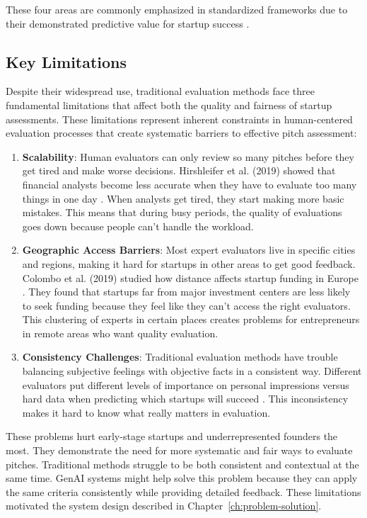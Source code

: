 These four areas are commonly emphasized in standardized frameworks due to their demonstrated predictive value for startup success \cite{Kalvapalle2024}.

\subsection{Key Limitations}\label{subsec:key-limitations}
Despite their widespread use, traditional evaluation methods face three fundamental limitations that affect both the quality and fairness of startup assessments. These limitations represent inherent constraints in human-centered evaluation processes that create systematic barriers to effective pitch assessment:

\begin{enumerate}
    \item \textbf{Scalability}: Human evaluators can only review so many pitches before they get tired and make worse decisions. Hirshleifer et al. (2019) showed that financial analysts become less accurate when they have to evaluate too many things in one day \cite{Hirshleifer2019}. When analysts get tired, they start making more basic mistakes. This means that during busy periods, the quality of evaluations goes down because people can't handle the workload.

    \item \textbf{Geographic Access Barriers}: Most expert evaluators live in specific cities and regions, making it hard for startups in other areas to get good feedback. Colombo et al. (2019) studied how distance affects startup funding in Europe \cite{Colombo2019}. They found that startups far from major investment centers are less likely to seek funding because they feel like they can't access the right evaluators. This clustering of experts in certain places creates problems for entrepreneurs in remote areas who want quality evaluation.

    \item \textbf{Consistency Challenges}: Traditional evaluation methods have trouble balancing subjective feelings with objective facts in a consistent way. Different evaluators put different levels of importance on personal impressions versus hard data when predicting which startups will succeed \cite{Tsay2021VISUALSDI}. This inconsistency makes it hard to know what really matters in evaluation.
\end{enumerate}

These problems hurt early-stage startups and underrepresented founders the most. They demonstrate the need for more systematic and fair ways to evaluate pitches. Traditional methods struggle to be both consistent and contextual at the same time. GenAI systems might help solve this problem because they can apply the same criteria consistently while providing detailed feedback. These limitations motivated the system design described in Chapter~\ref{ch:problem-solution}.


